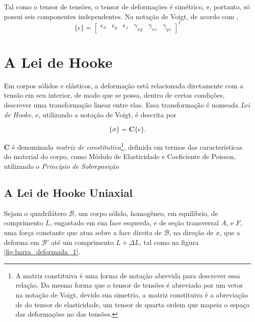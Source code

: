 Tal como o tensor de tensões, o tensor de deformações é simétrico, e, portanto, só possui seis componentes independentes. Na notação de Voigt, de acordo com ,
\begin{equation}
    \{\epsilon\} = \begin{bmatrix}
        \epsilon_x & \epsilon_y & \epsilon_z & \gamma_{xy} & \gamma_{xz} & \gamma_{yz}
    \end{bmatrix}^t
\end{equation}

\section{A Lei de Hooke}

Em corpos sólidos e elásticos, a deformação está relacionada diretamente com a tensão em seu interior, de modo que se possa, dentro de certas condições, descrever uma transformação linear entre elas. Essa transformação é nomeada \emph{Lei de Hooke}, e, utilizando a notação de Voigt, é descrita por

\begin{equation}
    \{\sigma\} = \bm{C} \{\epsilon\}.
    \label{eq:lei_de_hooke}
\end{equation}

$\bm{C}$ é denominada \emph{matriz de constitutiva}\footnote{A matriz constituiva é uma forma de notação abrevida para descrever essa relação. Da mesma forma que o tensor de tensões é abreviado por um vetor na notação de Voigt, devido sua simetria, a matriz constituiva é a abreviação de do tensor de elasticidade, um tensor de quarta ordem que mapeia o espaço das deformações no das tensões.}, definida em termos das características do material do corpo, como Módulo de Elasticidade e Coeficiente de Poisson, utilizando o \emph{Princípio de Sobreposição}

\subsection{A Lei de Hooke Uniaxial}

Sejam o quadrilátero $\mathcal{B}$, um corpo sólido, homogêneo, em equilíbrio, de comprimento $L$, engastado em sua face esquerda, e de seção transversal $A$, e $F$, uma força constante que atua sobre a face direita de $\mathcal{B}$, na direção de $x$, que a deforma em $\mathcal{B}'$ até um comprimento $L+\Delta L$, tal como na figura \ref{fig:barra_deformada_1}. 



